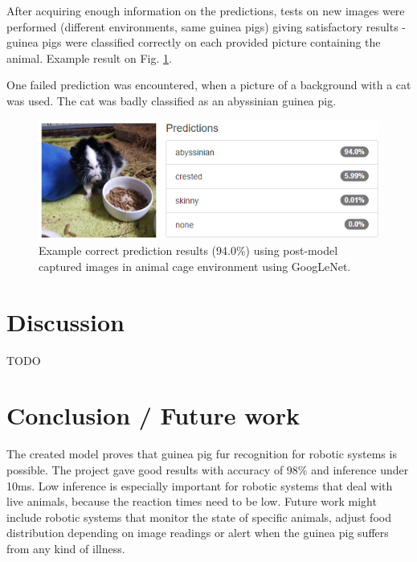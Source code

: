 \documentclass[10pt,journal,compsoc]{IEEEtran}
\begin{document}
    After acquiring enough information on the predictions, tests on new images were performed (different environments, same guinea pigs) giving satisfactory results - guinea pigs were classified correctly on each provided picture containing the animal. Example result on Fig. \ref{fig:result_02}.

    One failed prediction was encountered, when a picture of a background with a cat was used. The cat was badly classified as an abyssinian guinea pig.

    \begin{figure}[h]
        \includegraphics[width=\linewidth]{result_02.png}
        \caption{Example correct prediction results (94.0\%) using post-model captured images in animal cage environment using GoogLeNet.}
        \label{fig:result_02}
        \centering
    \end{figure}
    
    \section{Discussion}
    TODO
    
    \section{Conclusion / Future work}
    The created model proves that guinea pig fur recognition for robotic systems is possible. The project gave good results with accuracy of 98\% and inference under 10ms. Low inference is especially important for robotic systems that deal with live animals, because the reaction times need to be low. \newline\newline
    Future work might include robotic systems that monitor the state of specific animals, adjust food distribution depending on image readings or alert when the guinea pig suffers from any kind of illness.
    
   
   
    
    
\end{document}

